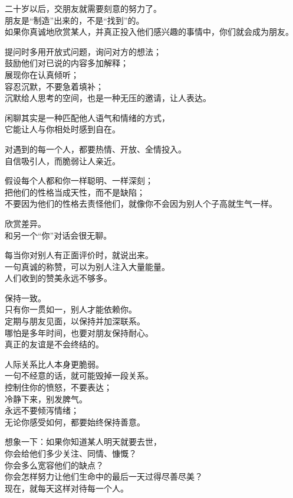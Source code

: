 \documentclass[
]{article}
\begin{document}
二十岁以后，交朋友就需要刻意的努力了。\\
朋友是``制造''出来的，不是``找到''的。\\
如果你真诚地欣赏某人，并真正投入他们感兴趣的事情中，你们就会成为朋友。

提问时多用开放式问题，询问对方的想法；\\
鼓励他们对已说的内容多加解释；\\
展现你在认真倾听；\\
容忍沉默，不要急着填补；\\
沉默给人思考的空间，也是一种无压的邀请，让人表达。

闲聊其实是一种匹配他人语气和情绪的方式，\\
它能让人与你相处时感到自在。

对遇到的每一个人，都要热情、开放、全情投入。\\
自信吸引人，而脆弱让人亲近。

假设每个人都和你一样聪明、一样深刻；\\
把他们的性格当成天性，而不是缺陷；\\
不要因为他们的性格去责怪他们，就像你不会因为别人个子高就生气一样。

欣赏差异。\\
和另一个``你''对话会很无聊。

每当你对别人有正面评价时，就说出来。\\
一句真诚的称赞，可以为别人注入大量能量。\\
人们收到的赞美永远不够多。

保持一致。\\
只有你一贯如一，别人才能依赖你。\\
定期与朋友见面，以保持并加深联系。\\
哪怕是多年时间，也要对朋友保持耐心。\\
真正的友谊是不会终结的。

人际关系比人本身更脆弱。\\
一句不经意的话，就可能毁掉一段关系。\\
控制住你的愤怒，不要表达；\\
冷静下来，别发脾气。\\
永远不要倾泻情绪；\\
无论你感受如何，都要始终保持善意。

想象一下：如果你知道某人明天就要去世，\\
你会给他们多少关注、同情、慷慨？\\
你会多么宽容他们的缺点？\\
你会怎样努力让他们生命中的最后一天过得尽善尽美？\\
现在，就每天这样对待每一个人。
\end{document}
